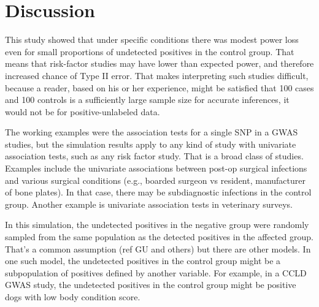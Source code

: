 \documentclass[
]{article}
\begin{document}
\pagebreak

\hypertarget{discussion}{%
\section{Discussion}\label{discussion}}

This study showed that under specific conditions there was modest power
loss even for small proportions of undetected positives in the control
group. That means that risk-factor studies may have lower than expected
power, and therefore increased chance of Type II error. That makes
interpreting such studies difficult, because a reader, based on his or
her experience, might be satisfied that 100 cases and 100 controls is a
sufficiently large sample size for accurate inferences, it would not be
for positive-unlabeled data.

The working examples were the association tests for a single SNP in a
GWAS studies, but the simulation results apply to any kind of study with
univariate association tests, such as any risk factor study. That is a
broad class of studies. Examples include the univariate associations
between post-op surgical infections and various surgical conditions
(e.g., boarded surgeon vs resident, manufacturer of bone plates). In
that case, there may be subdiagnostic infections in the control group.
Another example is univariate association tests in veterinary surveys.

In this simulation, the undetected positives in the negative group were
randomly sampled from the same population as the detected positives in
the affected group. That's a common assumption (ref GU and others) but
there are other models.\cite{gr04} In one such model, the undetected
positives in the control group might be a subpopulation of positives
defined by another variable. For example, in a CCLD GWAS study, the
undetected positives in the control group might be positive dogs with
low body condition score.

\newpage



\end{document}
